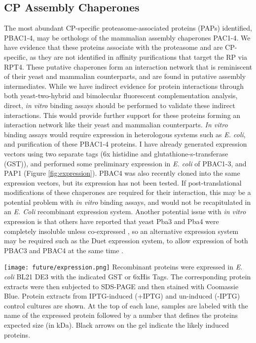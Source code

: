 \subsection{CP Assembly Chaperones}
	The most abundant CP-specific proteasome-associated proteins (PAPs) identified, PBAC1-4, may be orthologs of the mammalian assembly chaperones PAC1-4. We have evidence that these proteins associate with the proteasome and are CP-specific, as they are not identified in affinity purifications that target the RP via RPT4. These putative chaperones form an interaction network that is reminiscent of their yeast and mammalian counterparts, and are found in putative assembly intermediates. While we have indirect evidence for protein interactions through both yeast-two-hybrid and bimolecular fluorescent complementation analysis, direct, \textit{in vitro} binding assays should be performed to validate these indirect interactions. This would provide further support for these proteins forming an interaction network like their yeast and mammalian counterparts. \textit{In vitro} binding assays would require expression in heterologous systems such as \textit{E. coli}, and purification of these PBAC1-4 proteins. I have already generated expression vectors using two separate tags (6x histidine and glutathione-s-transferase (GST)), and performed some preliminary expression in \textit{E. coli} of PBAC1-3, and PAP1 (Figure \ref{fig:expression}). PBAC4 was also recently cloned into the same expression vectors, but its expression has not been tested.  If post-translational modifications of these chaperones are required for their interaction, this may be a potential problem with \textit{in vitro} binding assays, and would not be recapitulated in an \textit{E. Coli} recombinant expression system. Another potential issue with \textit{in vitro} expression is that others have reported that yeast Pba3 and Pba4 were completely insoluble unless co-expressed \citep{kusmierczyk08}, so an alternative expression system may be required such as the Duet expression system, to allow expression of both PBAC3 and PBAC4 at the same time \citep{scheich07}.  

\begin{FPfigure}
	\centering
	\texttt{[image: future/expression.png]}
	{Recombinant proteins were expressed in \textit{E. coli} BL21 DE3 with the indicated GST or 6xHis Tags. The corresponding protein extracts were then subjected to SDS-PAGE and then stained with Coomassie Blue. Protein extracts from IPTG-induced (+IPTG) and un-induced (-IPTG) control cultures are shown. At the top of each lane, samples are labeled with the name of the expressed protein followed by a number that defines the proteins expected size (in kDa). Black arrows on the gel indicate the likely induced proteins.}
	\label{fig:expression}
\end{FPfigure}
	
